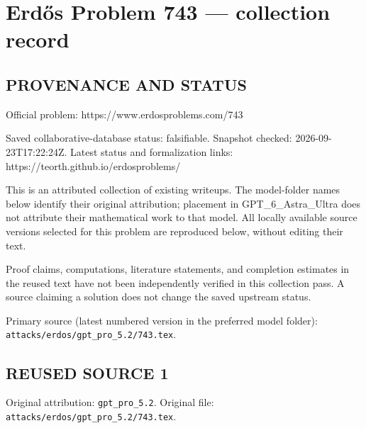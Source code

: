 \section*{Erd\H{o}s Problem 743 --- collection record}

\subsection*{PROVENANCE AND STATUS}
Official problem: https://www.erdosproblems.com/743

Saved collaborative-database status: falsifiable.
Snapshot checked: 2026-09-23T17:22:24Z.
Latest status and formalization links: https://teorth.github.io/erdosproblems/

This is an attributed collection of existing writeups. The model-folder names below identify their original attribution; placement in GPT\_6\_Astra\_Ultra does not attribute their mathematical work to that model. All locally available source versions selected for this problem are reproduced below, without editing their text.

Proof claims, computations, literature statements, and completion estimates in the reused text have not been independently verified in this collection pass. A source claiming a solution does not change the saved upstream status.

Primary source (latest numbered version in the preferred model folder): \texttt{attacks/erdos/gpt\_pro\_5.2/743.tex}.

\subsection*{REUSED SOURCE 1}
Original attribution: \texttt{gpt\_pro\_5.2}.
Original file: \texttt{attacks/erdos/gpt\_pro\_5.2/743.tex}.


